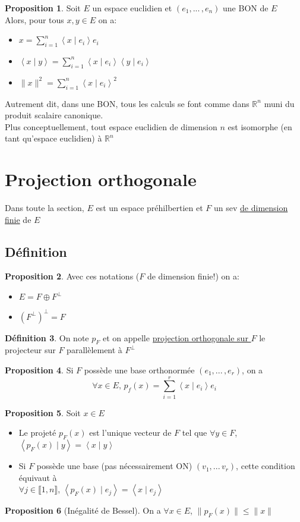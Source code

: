 \documentclass[10pt,a4paper]{article}
\theoremstyle{definition}
\newtheorem{proposition}{Proposition}[section]
\newtheorem{definition}[proposition]{Définition}
\newcommand{\vp}[2]{\left< #1 \mid #2 \right>}
\begin{document}
\begin{proposition}
Soit $E$ un espace euclidien et $(e_1, ...\,, e_n)$ une BON de $E$ \\
Alors, pour tous $x, y \in E$ on a:
\begin{itemize}
\item $x = \sum\limits_{i = 1}^n \vp{x}{e_i} e_i$
\item $\vp{x}{y} = \sum\limits_{i = 1}^n \vp{x}{e_i} \vp{y}{e_i}$
\item $\lVert x \rVert^2 = \sum\limits_{i = 1}^n \vp{x}{e_i}^2$
\end{itemize}
Autrement dit, dans une BON, tous les calculs se font comme dans $\mathbb{R}^n$ muni du produit scalaire canonique. \\
Plus conceptuellement, tout espace euclidien de dimension $n$ est isomorphe (en tant qu'espace euclidien) à $\mathbb{R}^n$
\end{proposition}

\section{Projection orthogonale}
Dans toute la section, $E$ est un espace préhilbertien et $F$ un sev \uline{de dimension finie} de $E$
\subsection{Définition}
\begin{proposition}
Avec ces notations ($F$ de dimension finie!) on a:
\begin{itemize}
\item $E = F \oplus F^\perp$
\item $\left(F^\perp\right)^\perp = F$
\end{itemize}
\end{proposition}
\begin{definition}
On note $p_F$ et on appelle \uline{projection orthogonale sur $F$} le projecteur sur $F$ parallèlement à $F^\perp$
\end{definition}
\begin{proposition}
Si $F$ possède une base orthonormée $(e_1, ...\,, e_r)$, on a 
\[\forall x \in E ,\, p_f(x) = \sum\limits_{i = 1}^r \vp{x}{e_i} e_i \]
\end{proposition}
\begin{proposition}
Soit $x \in E$
\begin{itemize}
\item Le projeté $p_F(x)$ est l'unique vecteur de $F$ tel que $\forall y \in F$, $\vp{p_F(x)}{y} = \vp{x}{y}$
\item Si $F$ possède une base (pas nécessairement ON) $(v_1, ...\, v_r)$, cette condition équivaut à \\
$\forall j \in \llbracket 1, n \rrbracket$, $\vp{p_F(x)}{e_j} = \vp{x}{e_j}$
\end{itemize}
\end{proposition}
\begin{proposition}[Inégalité de Bessel]
On a $\forall x \in E$, $\lVert p_F(x) \rVert \leq \lVert x \rVert$
\end{proposition}
\end{document}
